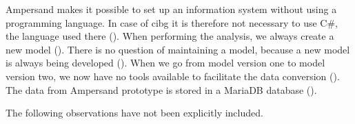 Ampersand makes it possible to set up an information system without using a programming language.
In case of \acrshort{cibg} it is therefore not necessary to use C\#, the language used there ().
When performing the analysis, we always create a new model ().
There is no question of maintaining a model, because a new model is always being developed ().
When we go from model version one to model version two, we now have no tools available to facilitate the data conversion ().
The data from Ampersand prototype is stored in a MariaDB database ().

The following observations have not been explicitly included.
